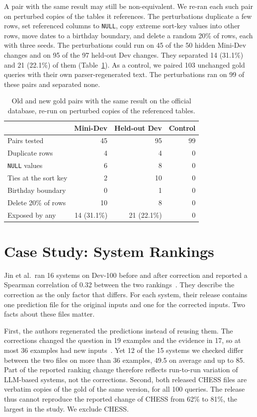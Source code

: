 \documentclass[conference]{IEEEtran}
\begin{document}
A pair with the same result may still be non-equivalent. We re-ran each such pair
on perturbed copies of the tables it references. The perturbations duplicate a
few rows, set referenced columns to \texttt{NULL}, copy extreme sort-key values
into other rows, move dates to a birthday boundary, and delete a random 20\% of
rows, each with three seeds. The perturbations could run on 45 of the 50 hidden
Mini-Dev changes and on 95 of the 97 held-out Dev changes. They separated 14
(31.1\%) and 21 (22.1\%) of them (Table~\ref{tab:mutation}). As a control, we
paired 103 unchanged gold queries with their own parser-regenerated text. The
perturbations ran on 99 of these pairs and separated none.

\begin{table}[t]
\caption{Old and new gold pairs with the same result on the official database,
re-run on perturbed copies of the referenced tables.}
\label{tab:mutation}
\centering
\footnotesize
\begin{tabular}{@{}lrrr@{}}
\toprule
 & Mini-Dev & Held-out Dev & Control \\
\midrule
Pairs tested & 45 & 95 & 99 \\
\midrule
Duplicate rows & 4 & 4 & 0 \\
\texttt{NULL} values & 6 & 8 & 0 \\
Ties at the sort key & 2 & 10 & 0 \\
Birthday boundary & 0 & 1 & 0 \\
Delete 20\% of rows & 10 & 8 & 0 \\
\midrule
Exposed by any & 14 (31.1\%) & 21 (22.1\%) & 0 \\
\bottomrule
\end{tabular}
\end{table}

\section{Case Study: System Rankings}
\label{sec:rankings}

Jin et al.\ ran 16 systems on Dev-100 before and after correction and reported a
Spearman correlation of 0.32 between the two rankings~\cite{jin2026pervasive}.
They describe the correction as the only factor that differs. For each system,
their release contains one prediction file for the original inputs and one for
the corrected inputs. Two facts about these files matter.

First, the authors regenerated the predictions instead of reusing them. The
corrections changed the question in 19 examples and the evidence in 17, so at
most 36 examples had new inputs~\cite{jin2026pervasive}. Yet 12 of the 15
systems we checked differ between the two files on more than 36 examples, 49.5
on average and up to 85. Part of the reported ranking change therefore reflects
run-to-run variation of LLM-based systems, not the corrections. Second, both
released CHESS files are verbatim copies of the gold of the same version, for
all 100 queries. The release thus cannot reproduce the reported change of CHESS
from 62\% to 81\%, the largest in the study. We exclude CHESS.
\end{document}
